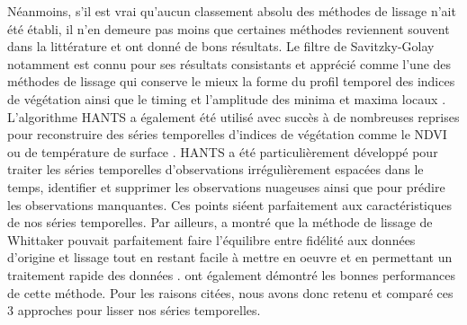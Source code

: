 Néanmoins, s'il est vrai qu'aucun classement absolu des méthodes de lissage n'ait été établi, il n'en demeure pas moins que certaines méthodes reviennent souvent dans la littérature et ont donné de bons résultats. Le filtre de Savitzky-Golay notamment est connu pour ses résultats consistants \citep{Chen2004,Bojanowski2009,Kandasamy2012,Kim2014,Geng2014} et apprécié comme l'une des méthodes de lissage qui conserve le mieux la forme du profil temporel des indices de végétation ainsi que le timing et l'amplitude des minima et maxima locaux \citep{Geng2014}. L'algorithme HANTS a également été utilisé avec succès à de nombreuses reprises pour reconstruire des séries temporelles d'indices de végétation comme le NDVI ou de température de surface \citep{Roerink2000,Jakubauskas2001,Lunetta2006,Julien2006,Zhou2012,Zhou2015}. HANTS a été particulièrement développé pour traiter les séries temporelles d'observations irrégulièrement espacées dans le temps, identifier et supprimer les observations nuageuses \citep{Verhoef1996,Roerink2000} ainsi que pour prédire les observations manquantes. Ces points siéent parfaitement aux caractéristiques de nos séries temporelles. Par ailleurs, \citet{Atzberger2011} a montré que la méthode de lissage de Whittaker pouvait parfaitement faire l'équilibre entre fidélité aux données d'origine et lissage tout en restant facile à mettre en oeuvre et en permettant un traitement rapide des données \citep{Eilers2003}. \citet{Atkinson2012,Geng2014,Shao2016} ont également démontré les bonnes performances de cette méthode. Pour les raisons citées, nous avons donc retenu et comparé ces 3 approches pour lisser nos séries temporelles.

